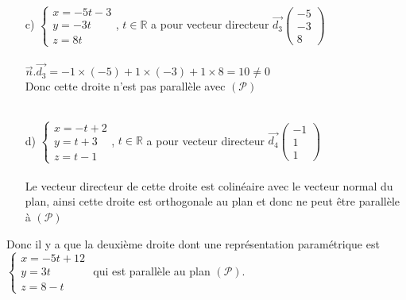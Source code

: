 \documentclass[a4paper, 12pt]{article}
\begin{document}
\begin{itemize}
    \item[c)] $\begin{cases} x = -5t - 3 \\ y = -3t \\ z = 8t \end{cases}$, $t \in \mathds{R}$ a pour vecteur directeur $\vec{d_3}\begin{pmatrix} -5 \\ -3 \\ 8 \end{pmatrix}$ \\ \\ 
        $\vec{n}.\vec{d_3} = -1 \times (-5) + 1 \times (-3) + 1 \times 8 = 10 \neq 0$ \\ 
        Donc cette droite n'est pas parallèle avec $(\mathcal{P})$\\ \\

    \item[d)] $\begin{cases} x = -t + 2 \\ y = t + 3 \\ z = t - 1 \end{cases}$, $t \in \mathds{R}$ a pour vecteur directeur $\vec{d_4}\begin{pmatrix} -1 \\ 1 \\ 1 \end{pmatrix}$ \\ \\ 
    Le vecteur directeur de cette droite est colinéaire avec le vecteur normal du plan, ainsi cette droite est orthogonale au plan et donc ne peut être parallèle à $(\mathcal{P})$\\ 
\end{itemize}
Donc il y a que la deuxième droite dont une représentation paramétrique est $\begin{cases} x = -5t + 12 \\ y = 3t \\ z = 8-t \end{cases}$ 
qui est parallèle au plan $(\mathcal{P})$.

{}
\end{document}
